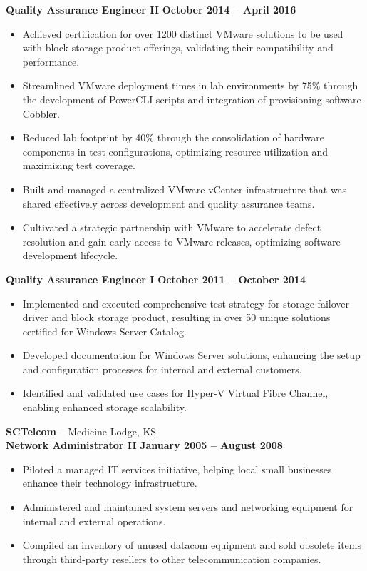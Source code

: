 \documentclass[10pt]{article}       %
\begin{document}
\textbf{Quality Assurance Engineer II} \hfill \textbf{October 2014 – April 2016} \\
\vspace{-6.5pt}
\begin{itemize}
  \item Achieved certification for over 1200 distinct VMware solutions to be used with block storage product offerings, validating their compatibility and performance.
  \item Streamlined VMware deployment times in lab environments by 75\% through the development of PowerCLI scripts and integration of provisioning software Cobbler.
  \item Reduced lab footprint by 40\% through the consolidation of hardware components in test configurations, optimizing resource utilization and maximizing test coverage.
  \item Built and managed a centralized VMware vCenter infrastructure that was shared effectively across development and quality assurance teams.
  \item Cultivated a strategic partnership with VMware to accelerate defect resolution and gain early access to VMware releases, optimizing software development lifecycle.
\end{itemize}

\textbf{Quality Assurance Engineer I} \hfill \textbf{October 2011 – October 2014} \\
\vspace{-6.5pt}
\begin{itemize}
  \item Implemented and executed comprehensive test strategy for storage failover driver and block storage product, resulting in over 50 unique solutions certified for Windows Server Catalog.
  \item Developed documentation for Windows Server solutions, enhancing the setup and configuration processes for internal and external customers.
  \item Identified and validated use cases for Hyper-V Virtual Fibre Channel, enabling enhanced storage scalability.
\end{itemize}

\vspace{2pt}

\textbf{SCTelcom} – Medicine Lodge, KS \\
\textbf{Network Administrator II} \hfill \textbf{January 2005 – August 2008} \\
\vspace{-6.5pt}
\begin{itemize}
  \item Piloted a managed IT services initiative, helping local small businesses enhance their technology infrastructure.
  \item Administered and maintained system servers and networking equipment for internal and external operations.
  \item Compiled an inventory of unused datacom equipment and sold obsolete items through third-party resellers to other telecommunication companies.
\end{itemize}
\end{document}
